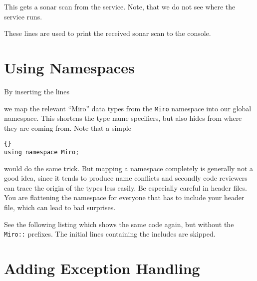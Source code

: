 

This gets a sonar scan from the service. Note, that we do not see where
the service runs.



These lines are used to print the received sonar scan to the
console.

%




\section{Using Namespaces}

By inserting the lines



we map the relevant ``Miro'' data types from the \lstinline!Miro!
namespace into our global namespace. This shortens the type name
specifiers, but also hides from where they are coming from. Note that
a simple

\begin{lstlisting}[frame=tb]{}
using namespace Miro;
\end{lstlisting}

would do the same trick. But mapping a namespace completely is
generally not a good idea, since it tends to produce name conflicts
and secondly code reviewers can trace the origin of the types less
easily. Be especially careful in header files. You are flattening the
namespace for everyone that has to include your header file, which can
lead to bad surprises.

See the following listing which shows the same code again, but without
the \lstinline!Miro::! prefixes. The initial lines containing the includes
are skipped.


\label{lst:SonarPoll2}


\section{Adding Exception Handling}

